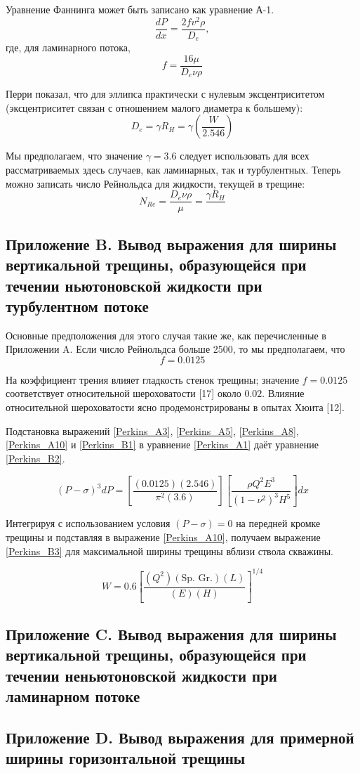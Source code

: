 \documentclass[a4paper, 12pt]{article}
\newcommand{\beq}{\begin{equation}}
\newcommand{\eeq}{\end{equation}}
\begin{document}
Уравнение Фаннинга может быть записано как уравнение А-1.
\beq\label{Perkins_A1}
\frac{dP}{dx}=\frac{2fv^2\rho}{D_e},
\tag{A-1}
\eeq
где, для ламинарного потока,
\beq\label{Perkins_A2}
f=\frac{16\mu}{D_e\nu\rho}
\tag{A-2}
\eeq

Перри показал, что для эллипса практически с нулевым эксцентриситетом (эксцентриситет связан с отношением малого диаметра к большему):
\beq\label{Perkins_A3}
D_e=\gamma R_H=\gamma\left(\frac{W}{2.546}\right)
\tag{A-3}
\eeq


Мы предполагаем, что значение $\gamma=3.6$ следует использовать для всех рассматриваемых здесь случаев, как ламинарных, так и турбулентных.
Теперь можно записать число Рейнольдса для жидкости, текущей в трещине:
\beq\label{Perkins_A6}
N_{Re}=\frac{D_e\nu\rho}{\mu}=\frac{\gamma R_H}{}
\tag{A-6}
\eeq


\subsection{Приложение B. Вывод выражения для ширины вертикальной трещины, образующейся при течении ньютоновской жидкости при турбулентном потоке}

Основные предположения для этого случая такие же, как перечисленные в Приложении A.
Если число Рейнольдса больше 2500, то мы предполагаем, что
\beq\label{Perkins_B1}
f=0.0125
\tag{B-1}
\eeq

На коэффициент трения влияет гладкость стенок трещины; значение $f=0.0125$ соответствует относительной шероховатости [17] около $0.02$.
Влияние относительной шероховатости ясно продемонстрированы в опытах Хюита [12].

Подстановка выражений \eqref{Perkins_A3}, \eqref{Perkins_A5}, \eqref{Perkins_A8}, \eqref{Perkins_A10} и \eqref{Perkins_B1} в уравнение \eqref{Perkins_A1} даёт уравнение \eqref{Perkins_B2}.

\beq\label{Perkins_B2}
\left(P-\sigma\right)^3dP=\left[\frac{(0.0125)(2.546)}{\pi^2(3.6)}\right]\left[\frac{\rho Q^2E^3}{(1-\nu^2)^3H^5}\right]dx
\tag{B-2}
\eeq

Интегрируя с использованием условия $\left(P-\sigma\right)=0$ на передней кромке трещины и подставляя в выражение \eqref{Perkins_A10}, получаем выражение \eqref{Perkins_B3} для максимальной ширины трещины вблизи ствола скважины.

\beq\label{Perkins_B3}
W=0.6\left[\frac{(Q^2)(\text{Sp. Gr.})(L)}{(E)(H)}\right]^{1/4}
\tag{B-3}
\eeq

\subsection{Приложение C. Вывод выражения для ширины вертикальной трещины, образующейся при течении неньютоновской жидкости при ламинарном потоке}

\subsection{Приложение D. Вывод выражения для примерной ширины горизонтальной трещины}
\end{document}
